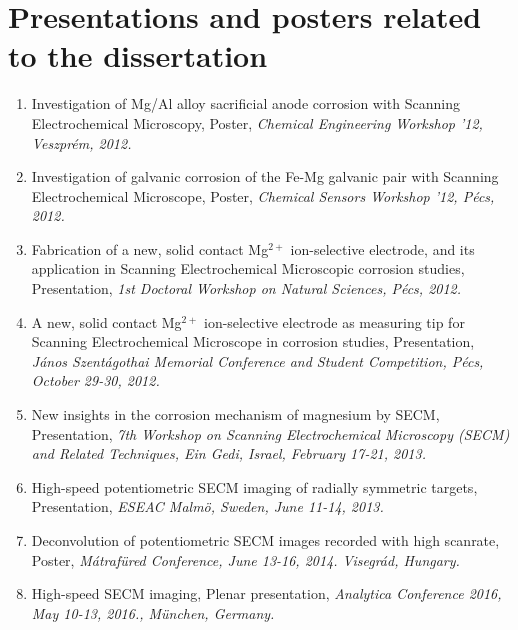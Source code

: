 \documentclass[11pt,a4paper,roman]{article}
\begin{document}
\section{Presentations and posters related to the dissertation}
\begin{enumerate}
\item Investigation of Mg/Al alloy sacrificial anode corrosion with Scanning Electrochemical Microscopy, Poster, \emph{Chemical Engineering Workshop ’12, Veszprém, 2012.}

\item Investigation of galvanic corrosion of the Fe-Mg galvanic pair with Scanning Electrochemical Microscope, Poster, \emph{Chemical Sensors Workshop ’12, Pécs, 2012.}

\item Fabrication of a new, solid contact Mg$^{2+}$ ion-selective electrode, and its application in Scanning Electrochemical Microscopic corrosion studies, Presentation, \emph{1st Doctoral Workshop on Natural Sciences, Pécs, 2012.}

\item A new, solid contact Mg$^{2+}$ ion-selective electrode as measuring tip for Scanning Electrochemical Microscope in corrosion studies, Presentation, \emph{János Szentágothai Memorial Conference and Student Competition, Pécs, October 29-30, 2012.}

\item New insights in the corrosion mechanism of magnesium by SECM, Presentation, \emph{7th Workshop on Scanning Electrochemical Microscopy (SECM) and Related Techniques, Ein Gedi, Israel, February 17-21, 2013.}

\item High-speed potentiometric SECM imaging of radially symmetric targets, Presentation, \emph{ESEAC Malmö, Sweden, June 11-14, 2013.}

\item Deconvolution of potentiometric SECM images recorded with high scanrate, Poster, \emph{Mátrafüred Conference, June 13-16, 2014. Visegrád, Hungary.}

\item High-speed SECM imaging, Plenar presentation, \emph{Analytica Conference 2016, May 10-13, 2016., München, Germany.}
\end{enumerate}
\end{document}
